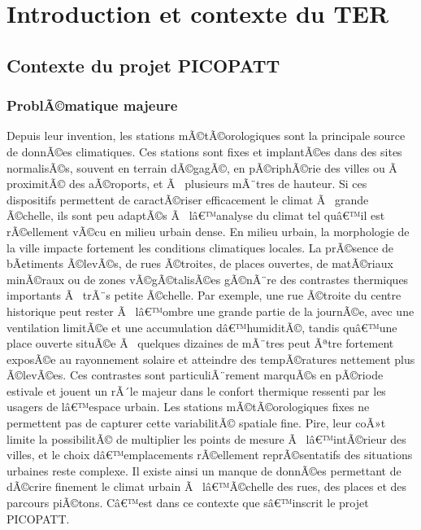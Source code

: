 \documentclass{article}
\begin{document}
\tableofcontents
\newpage

\section{Introduction et contexte du TER}
\label{sec:intro}

\subsection{Contexte du projet PICOPATT}

\subsubsection{ProblÃ©matique majeure}

Depuis leur invention, les stations mÃ©tÃ©orologiques sont la principale source de donnÃ©es climatiques. Ces stations sont fixes et implantÃ©es dans des sites normalisÃ©s, souvent en terrain dÃ©gagÃ©, en pÃ©riphÃ©rie des villes ou Ã  proximitÃ© des aÃ©roports, et Ã  plusieurs mÃ¨tres de hauteur. Si ces dispositifs permettent de caractÃ©riser efficacement le climat Ã  grande Ã©chelle, ils sont peu adaptÃ©s Ã  lâ€™analyse du climat tel quâ€™il est rÃ©ellement vÃ©cu en milieu urbain dense. En milieu urbain, la morphologie de la ville impacte fortement les conditions climatiques locales. La prÃ©sence de bÃ¢timents Ã©levÃ©s, de rues Ã©troites, de places ouvertes, de matÃ©riaux minÃ©raux ou de zones vÃ©gÃ©talisÃ©es gÃ©nÃ¨re des contrastes thermiques importants Ã  trÃ¨s petite Ã©chelle. Par exemple, une rue Ã©troite du centre historique peut rester Ã  lâ€™ombre une grande partie de la journÃ©e, avec une ventilation limitÃ©e et une accumulation dâ€™humiditÃ©, tandis quâ€™une place ouverte situÃ©e Ã  quelques dizaines de mÃ¨tres peut Ãªtre fortement exposÃ©e au rayonnement solaire et atteindre des tempÃ©ratures nettement plus Ã©levÃ©es. Ces contrastes sont particuliÃ¨rement marquÃ©s en pÃ©riode estivale et jouent un rÃ´le majeur dans le confort thermique ressenti par les usagers de lâ€™espace urbain. Les stations mÃ©tÃ©orologiques fixes ne permettent pas de capturer cette variabilitÃ© spatiale fine. Pire, leur coÃ»t limite la possibilitÃ© de multiplier les points de mesure Ã  lâ€™intÃ©rieur des villes, et le choix dâ€™emplacements rÃ©ellement reprÃ©sentatifs des situations urbaines reste complexe. Il existe ainsi un manque de donnÃ©es permettant de dÃ©crire finement le climat urbain Ã  lâ€™Ã©chelle des rues, des places et des parcours piÃ©tons. Câ€™est dans ce contexte que sâ€™inscrit le projet PICOPATT.
\end{document}
